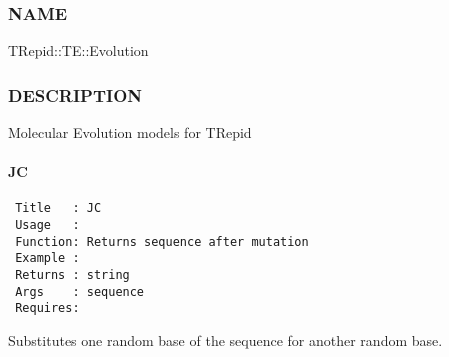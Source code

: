 \subsubsection*{NAME\label{NAME}}


TRepid::TE::Evolution

\subsubsection*{DESCRIPTION\label{DESCRIPTION}}


Molecular Evolution models for TRepid

\paragraph*{JC\label{JC}}
\begin{verbatim}
 Title   : JC
 Usage   : 
 Function: Returns sequence after mutation
 Example : 
 Returns : string
 Args    : sequence
 Requires:
\end{verbatim}


Substitutes one random base of the sequence for another random base.

